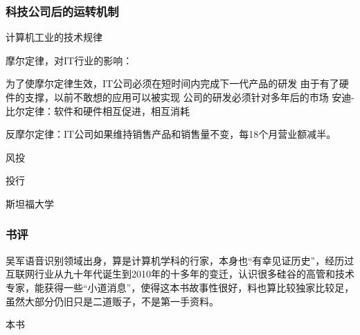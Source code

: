 \subsubsection{科技公司后的运转机制}
计算机工业的技术规律

摩尔定律，对IT行业的影响：

为了使摩尔定律生效，IT公司必须在短时间内完成下一代产品的研发
由于有了硬件的支撑，以前不敢想的应用可以被实现
公司的研发必须针对多年后的市场
安迪-比尔定律：软件和硬件相互促进，相互消耗

反摩尔定律：IT公司如果维持销售产品和销售量不变，每18个月营业额减半。

风投

投行

斯坦福大学

\subsubsection{书评}
吴军语音识别领域出身，算是计算机学科的行家，本身也“有幸见证历史”，经历过互联网行业从九十年代诞生到2010年的十多年的变迁，认识很多硅谷的高管和技术专家，能获得一些“小道消息”，使得这本书故事性很好，料也算比较独家比较足，虽然大部分仍旧只是二道贩子，不是第一手资料。

本书